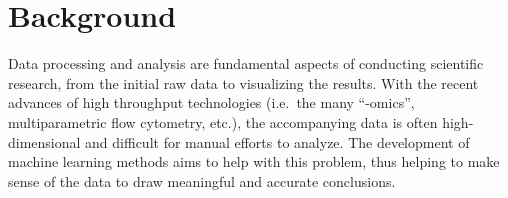 \documentclass[12pt,openany]{book}
\newenvironment{Shaded}{\begin{snugshade}}{\end{snugshade}}
\newcommand{\KeywordTok}[1]{\textcolor[rgb]{0.13,0.29,0.53}{\textbf{#1}}}
\newcommand{\DataTypeTok}[1]{\textcolor[rgb]{0.13,0.29,0.53}{#1}}
\newcommand{\StringTok}[1]{\textcolor[rgb]{0.31,0.60,0.02}{#1}}
\newcommand{\CommentTok}[1]{\textcolor[rgb]{0.56,0.35,0.01}{\textit{#1}}}
\newcommand{\OperatorTok}[1]{\textcolor[rgb]{0.81,0.36,0.00}{\textbf{#1}}}
\newcommand{\NormalTok}[1]{#1}
\begin{document}
\begin{Shaded}
\end{Shaded}

\chapter{Background}\label{bg}

Data processing and analysis are fundamental aspects of conducting
scientific research, from the initial raw data to visualizing the
results. With the recent advances of high throughput technologies
(i.e.~the many ``-omics'', multiparametric flow cytometry, etc.), the
accompanying data is often high-dimensional and difficult for manual
efforts to analyze. The development of machine learning methods aims to
help with this problem, thus helping to make sense of the data to draw
meaningful and accurate conclusions.
\end{document}
